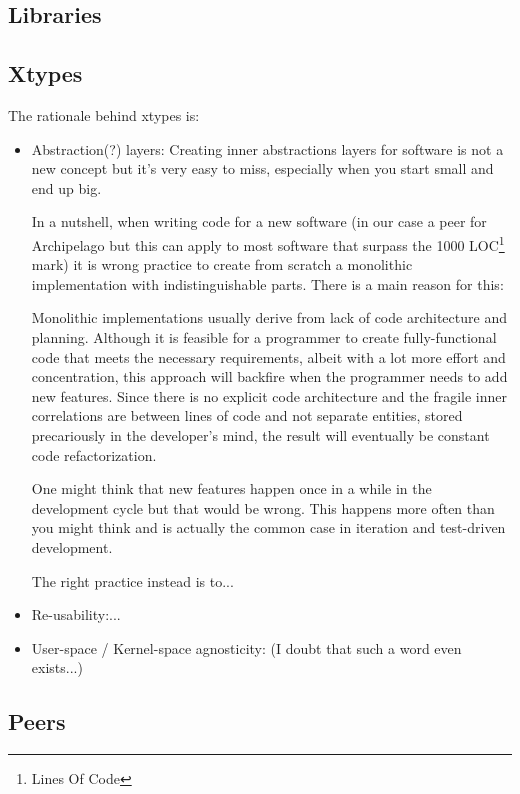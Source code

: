 \subsection{Libraries}

\subsection{Xtypes}\label{sec:arch-xtypes}

The rationale behind xtypes is:

\begin{itemize}
	\item Abstraction(?) layers: Creating inner abstractions layers for 
		software is not a new concept but it's very easy to miss, 
		especially when you start small and end up big.
		
		In a nutshell, when writing code for a new software (in our case 
		a peer for Archipelago but this can apply to most software that 
		surpass the 1000 LOC\footnote[1]
		{Lines Of Code}
		mark) it is wrong practice to create from scratch a monolithic 
		implementation with indistinguishable parts. There is a main 
		reason for this:
		
		Monolithic implementations usually derive from lack of code 
		architecture and planning. Although it is feasible for a 
		programmer to create fully-functional code that meets the 
		necessary requirements, albeit with a lot more effort and 
		concentration, this approach will backfire when the programmer 
		needs to add new features. Since there is no explicit code 
		architecture and the fragile inner correlations are between 
		lines of code and not separate entities, stored precariously in 
		the developer's mind, the result will eventually be constant 
		code refactorization.
		
		One might think that new features happen once in a while in the 
		development cycle but that would be wrong.  This happens more 
		often than you might think and is actually the common case in 
		iteration and test-driven development.

		The right practice instead is to...
	\item Re-usability:...
	\item User-space / Kernel-space agnosticity: (I doubt that such a word 
		even exists...)
\end{itemize}	

\subsection{Peers}\label{sec:arch-peer}

